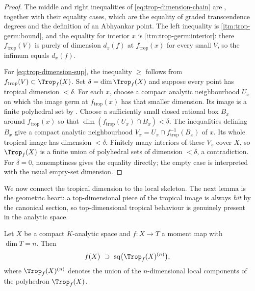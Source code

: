 \begin{proof}
The middle and right inequalities of \eqref{eq:trop-dimension-chain} are
, together with their equality cases,
which are the equality of graded transcendence degrees and the definition
of an Abhyankar point.
The left inequality is 
\cref{itm:trop-germ:bound}, and the equality for interior $x$ is
 \cref{itm:trop-germ:interior}: there
$f_{\mathrm{trop}}(V)$ is purely of dimension $d_x(f)$ at
$f_{\mathrm{trop}}(x)$ for every small $V$, so the infimum equals
$d_x(f)$.

For \eqref{eq:trop-dimension-sup}, the inequality $\ge$ follows from
$f_{\mathrm{trop}}(V)\subset\Trop_f(X)$. Set
$\delta=\dim\Trop_f(X)$ and suppose every point has tropical dimension
$<\delta$. For each $x$, choose a compact analytic neighbourhood $U_x$
on which the image germ at $f_{\mathrm{trop}}(x)$ has that smaller
dimension. Its image is a finite polyhedral set by
. Choose a sufficiently small
closed rational box $B_x$ around $f_{\mathrm{trop}}(x)$ so that
$\dim(f_{\mathrm{trop}}(U_x)\cap B_x)<\delta$. The inequalities defining
$B_x$ give a compact analytic neighbourhood
$V_x=U_x\cap f_{\mathrm{trop}}^{-1}(B_x)$ of $x$. Its whole tropical image
has dimension $<\delta$. Finitely many interiors of these $V_x$ cover $X$,
so $\Trop_f(X)$ is a finite union of polyhedral sets of dimension
$<\delta$, a contradiction. For $\delta=0$, nonemptiness gives the equality
directly; the empty case is interpreted with the usual empty-set dimension.
\end{proof}

We now connect the tropical dimension to the local skeleton. The next lemma
is the geometric heart: a top-dimensional piece of the tropical image is
always \emph{hit} by the canonical section, so top-dimensional tropical
behaviour is genuinely present in the analytic space.

\begin{lemma}
\label{lem:trop-skeleton-attained}
Let $X$ be a compact $K$-analytic space and $f:X\to T$ a moment map with
$\dim T=n$. Then
\[
 f(X)\ \supset\ \sq\bigl(\Trop_f(X)^{(n)}\bigr),
\]
where $\Trop_f(X)^{(n)}$ denotes the union of the $n$-dimensional local
components of the polyhedron $\Trop_f(X)$.
\end{lemma}

